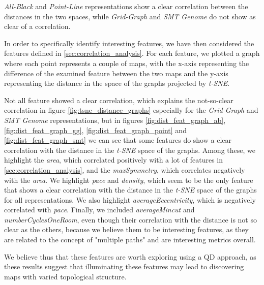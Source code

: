 \textit{All-Black} and \textit{Point-Line} representations show a clear correlation between the distances in the two spaces, while \textit{Grid-Graph} and \textit{SMT Genome} do not show as clear of a correlation. 

In order to specifically identify interesting features, we have then considered the features defined in \cref{sec:correlation_analysis}. For each feature, we plotted a graph where each point represents a couple of maps, with the x-axis representing the difference of the examined feature between the two maps and the y-axis representing the distance in the space of the graphs projected by \textit{t-SNE}. 

Not all feature showed a clear correlation, which explains the not-so-clear correlation in figure \cref{fig:tsne_distance_graphs} especially for the \textit{Grid-Graph} and \textit{SMT Genome} representations, but in figures \cref{fig:dist_feat_graph_ab}, \cref{fig:dist_feat_graph_gg}, \cref{fig:dist_feat_graph_point} and \cref{fig:dist_feat_graph_smt} we can see that some features do show a clear correlation with the distance in the \textit{t-SNE} space of the graphs. Among these, we highlight the \textit{area}, which correlated positively with a lot of features in \cref{sec:correlation_analysis}, and the \textit{maxSymmetry}, which correlates negatively with the \textit{area}. We highlight \textit{pace} and \textit{density}, which seem to be the only feature that shows a clear correlation with the distance in the \textit{t-SNE} space of the graphs for all representations. We also highlight \textit{averageEccentricity}, which is negatively correlated with \textit{pace}. Finally, we included \textit{averageMincut} and \textit{numberCyclesOneRoom}, even though their correlation with the distance is not so clear as the others, because we believe them to be interesting features, as they are related to the concept of "multiple paths" and are interesting metrics overall. 

We believe thus that these features are worth exploring using a QD approach, as these results suggest that illuminating these features may lead to discovering maps with varied topological structure.

